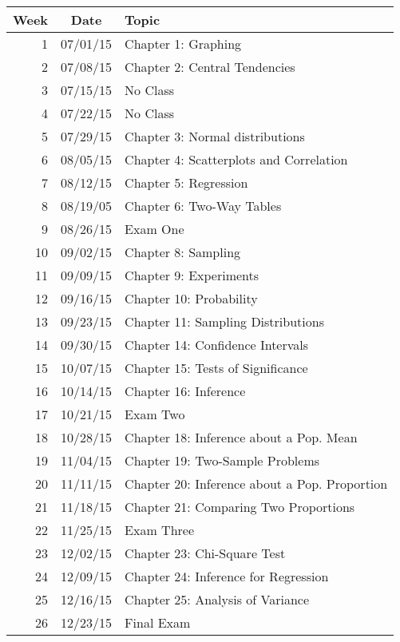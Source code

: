   \begin{tabular}[H]{rcl}
    \toprule
    Week & Date     & Topic \\
    \midrule
    1      & 07/01/15 & Chapter 1: Graphing \\
    2      & 07/08/15 & Chapter 2: Central Tendencies \\
    3      & 07/15/15 & No Class \\
    4      & 07/22/15 & No Class \\
    5      & 07/29/15 & Chapter 3: Normal distributions \\
    6      & 08/05/15 & Chapter 4: Scatterplots and Correlation \\
    7      & 08/12/15 & Chapter 5: Regression \\
    8      & 08/19/05 & Chapter 6: Two-Way Tables \\
    9      & 08/26/15 & Exam One \\
    10      & 09/02/15 & Chapter 8: Sampling \\
    11      & 09/09/15 & Chapter 9: Experiments \\
    12     & 09/16/15 & Chapter 10: Probability \\
    13     & 09/23/15 & Chapter 11: Sampling Distributions \\
    14     & 09/30/15 & Chapter 14: Confidence Intervals \\
    15     & 10/07/15 & Chapter 15: Tests of Significance \\
    16     & 10/14/15 & Chapter 16: Inference \\
    17     & 10/21/15 & Exam Two \\
    18     & 10/28/15 & Chapter 18: Inference about a Pop. Mean \\
    19     & 11/04/15 & Chapter 19: Two-Sample Problems \\
    20     & 11/11/15 & Chapter 20: Inference about a Pop. Proportion \\
    21     & 11/18/15 & Chapter 21: Comparing Two Proportions \\
    22     & 11/25/15 & Exam Three \\
    23     & 12/02/15 & Chapter 23: Chi-Square Test \\
    24     & 12/09/15 & Chapter 24: Inference for Regression \\
    25     & 12/16/15 & Chapter 25: Analysis of Variance \\
    26     & 12/23/15 & Final Exam \\
    \bottomrule
  \end{tabular}
